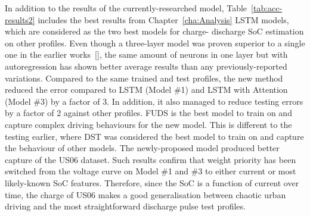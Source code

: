 %
%
In addition to the results of the currently-researched model, Table~\ref{tab:acc-results2} includes the best results from Chapter~\ref{cha:Analysis} LSTM models, which are considered as the two best models for charge- discharge SoC estimation on other profiles.
{Even though a three-layer model was proven superior to a single one in the earlier works~\ref{}, the same amount of neurons in one layer but with autoregression has shown better average results than any previously-reported variations.}
Compared to the same trained and test profiles, the new method reduced the error compared to LSTM (Model \#1) and LSTM with Attention (Model \#3) by a factor of 3.
In addition, it also managed to reduce testing errors by a factor of 2 against other profiles.
FUDS is the best model to train on and capture complex driving behaviours for the new model.
This is different to the testing earlier, where DST was considered the best model to train on and capture the behaviour of other models.
The newly-proposed model produced better capture of the US06 dataset.
Such results confirm that weight priority has been switched from the voltage curve on Model \#1 and \#3 to either current or most likely-known SoC features.
Therefore, since the SoC is a function of current over time, the charge of US06 makes a good generalisation between chaotic urban driving and the most straightforward discharge pulse test profiles.
